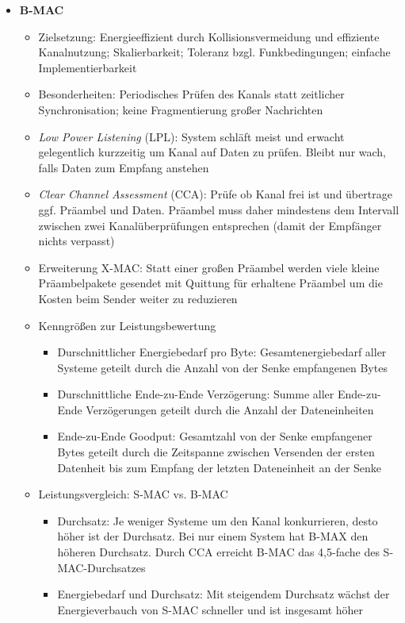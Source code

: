 \begin{itemize}
\begin{itemize}
	\end{itemize}
	\item \textbf{B-MAC}
	\begin{itemize}
		\item Zielsetzung: Energieeffizient durch Kollisionsvermeidung und effiziente Kanalnutzung; Skalierbarkeit; Toleranz bzgl. Funkbedingungen; einfache Implementierbarkeit
		\item Besonderheiten: Periodisches Prüfen des Kanals statt zeitlicher Synchronisation; keine Fragmentierung großer Nachrichten
		\item \textit{Low Power Listening} (LPL): System schläft meist und erwacht gelegentlich kurzzeitig um Kanal auf Daten zu prüfen. Bleibt nur wach, falls Daten zum Empfang anstehen
		\item \textit{Clear Channel Assessment} (CCA): Prüfe ob Kanal frei ist und übertrage ggf. Präambel und Daten. Präambel muss daher mindestens dem Intervall zwischen zwei Kanalüberprüfungen entsprechen (damit der Empfänger nichts verpasst)
		\item Erweiterung X-MAC: Statt einer großen Präambel werden viele kleine Präambelpakete gesendet mit Quittung für erhaltene Präambel um die Kosten beim Sender weiter zu reduzieren
		\item Kenngrößen zur Leistungsbewertung
		\begin{itemize}
			\item Durschnittlicher Energiebedarf pro Byte: Gesamtenergiebedarf aller Systeme geteilt durch die Anzahl von der Senke empfangenen Bytes
			\item Durschnittliche Ende-zu-Ende Verzögerung: Summe aller Ende-zu-Ende Verzögerungen geteilt durch die Anzahl der Dateneinheiten
			\item Ende-zu-Ende Goodput: Gesamtzahl von der Senke empfangener Bytes geteilt durch die Zeitspanne zwischen Versenden der ersten Datenheit bis zum Empfang der letzten Dateneinheit an der Senke
		\end{itemize}
		\item Leistungsvergleich: S-MAC vs. B-MAC
		\begin{itemize}
			\item Durchsatz: Je weniger Systeme um den Kanal konkurrieren, desto höher ist der Durchsatz. Bei nur einem System hat B-MAX den höheren Durchsatz. Durch CCA erreicht B-MAC das 4,5-fache des S-MAC-Durchsatzes
			\item Energiebedarf und Durchsatz: Mit steigendem Durchsatz wächst der Energieverbauch von S-MAC schneller und ist insgesamt höher

\end{itemize}
\end{itemize}
\end{itemize}
